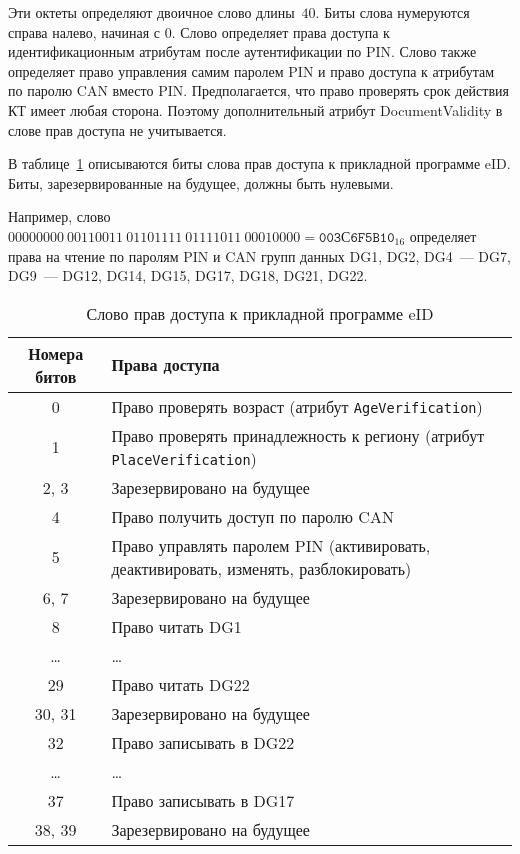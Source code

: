 
Эти октеты определяют двоичное слово длины~$40$.
Биты слова нумеруются справа налево, начиная с 0. 
Слово определяет права доступа к идентификационным атрибутам после 
аутентификации по PIN.  
%
Слово также определяет право управления самим паролем 
PIN и право доступа к атрибутам по паролю CAN вместо PIN. 
%
Предполагается, что право проверять срок действия КТ 
имеет любая сторона. Поэтому дополнительный атрибут DocumentValidity 
в слове прав доступа не учитывается. 

В таблице~\ref{Table.DATA.Access} описываются биты слова прав 
доступа к прикладной программе eID. Биты, зарезервированные на будущее, 
должны быть нулевыми.

Например, слово 
$00000000\ 00110011\ 01101111\ 01111011\ 00010000 = \texttt{003С6F5B10}_{16}$ 
определяет права на чтение по паролям PIN и CAN групп данных DG1, DG2, 
DG4~--- DG7, DG9~--- DG12, DG14, DG15, DG17, DG18, DG21, DG22.

\begin{table}[h!]
\caption{Слово прав доступа к прикладной программе eID}
\label{Table.DATA.Access}
\begin{tabular}{|c|p{13.5cm}|}
\hline
Номера битов & Права доступа\\
\hline
\hline
0 & 
Право проверять возраст (атрибут \verb|AgeVerification|)\\
\hline 
1  & 
Право проверять принадлежность к региону (атрибут \verb|PlaceVerification|)\\
\hline 
2, 3 & 
Зарезервировано на будущее\\
\hline 
4 & 
Право получить доступ по паролю CAN\\
\hline
5 & 
Право управлять паролем PIN
(активировать, деактивировать, изменять, разблокировать)\\
\hline 
6, 7 & 
Зарезервировано на будущее\\
\hline 
8  & 
Право читать DG1\\
\hline 
\dots &	\dots\\
\hline 
29 & 
Право читать DG22\\
\hline
30, 31 & 
Зарезервировано на будущее\\
\hline 
32 & 
Право записывать в DG22\\
\hline
\dots &	\dots  \\
\hline
37 & 
Право записывать в DG17\\
\hline 
38, 39 & 
Зарезервировано на будущее\\
\hline                                                                
\end{tabular}
\end{table}
                                                                            

